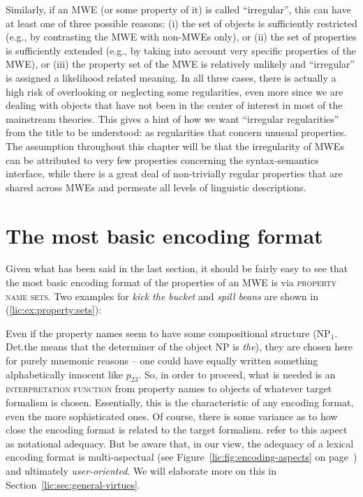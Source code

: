 \documentclass[output=paper]{langsci/langscibook}
\begin{document}
Similarly, if an MWE (or some property of it) is called ``irregular'', this can have at least one of three possible reasons: (i) the set of objects is sufficiently restricted (e.g., by contrasting the MWE with non-MWEs only), or (ii) the set of properties is sufficiently extended (e.g., by taking into account very specific properties of the MWE), or (iii) the property set of the  MWE is relatively unlikely and ``irregular'' is assigned a likelihood related meaning. 
In all three cases, there is actually a high risk of overlooking or neglecting some regularities, even more since we are dealing with objects that have not been in the center of interest in most of the mainstream  theories. This gives a hint of how we want ``irregular regularities'' from the title to be understood: as regularities that concern unusual properties. The assumption throughout this chapter will be that the irregularity of MWEs can be attributed to very few properties concerning the syntax-semantics interface, while there is a great deal of non-trivially regular properties that are shared across MWEs and permeate all levels of linguistic descriptions.
 

\section{The most basic encoding format}
\label{lic:sec:simplest-encoding}

Given what has been said in the last section, it should be fairly easy to see  that the most basic encoding format of the properties of an MWE is via \textsc{property name sets}. Two examples for \textit{kick the bucket} and \textit{spill beans} are shown in (\ref{lic:ex:property:sets}):

\eal \label{lic:ex:property:sets}
\zl

Even if the property names seem to have some compositional structure (NP$_1$. Det.the means that the determiner of the object NP is \textit{the}), they are chosen here for purely mnemonic reasons -- one could have equally written something alphabetically innocent like $p_{23}$. So, in order to proceed, what is needed is an \textsc{interpretation function} from property names to objects of whatever target formalism is chosen. Essentially, this is the characteristic of any encoding format, even the more sophisticated ones. Of course, there is some variance as to how close the encoding format is related to the target formalism. \cite{daelemans:vanderlinden:92} refer to this aspect as notational adequacy. But be aware that, in our view, the adequacy of a lexical encoding format is multi-aspectual (see Figure~\ref{lic:fig:encoding-aspects} on page~\pageref{lic:fig:encoding-aspects}) and ultimately \textit{user-oriented}. We will elaborate more on this in Section~\ref{lic:sec:general-virtues}.
\end{document}
